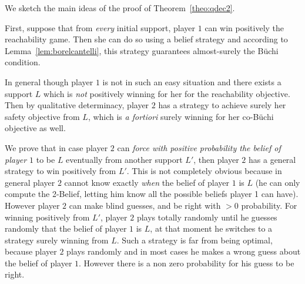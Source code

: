 
\smallskip
We sketch the main ideas of the proof of Theorem~\ref{theo:qdec2}.


First, suppose that from \emph{every} initial support, player $1$ can
win positively the  reachability game.
{Then she can do so using a belief strategy and according to Lemma~\ref{lem:borelcantelli},}
this strategy guarantees
almost-surely the B{\"u}chi condition.

In general though player $1$ is not in such an easy situation and
there exists a support $L$ which is \emph{not} positively winning
for her for the reachability objective.
Then by qualitative determinacy, player $2$ has a strategy to achieve surely her safety objective
from $L$, which is \emph{a fortiori}
surely winning for her co-B{\"u}chi objective as well.


We prove that in case player $2$ can \emph{force with positive
  probability the belief of player $1$} to be $L$ eventually from another
support $L'$, then player $2$
{ has a general strategy to win positively from $L'$}.
This is not completely obvious because in general player $2$ cannot
know exactly \emph{when} the belief of player $1$ is $L$ (he can only
compute the 2-Belief, letting him know all the possible beliefs player
1 can have).  However player $2$ can make blind guesses,
and be right with $>0$ probability.
For winning positively from $L'$, player $2$ plays
totally randomly until he guesses randomly that the belief of player
$1$ is $L$, at that moment he switches to a strategy surely winning
from $L$.  Such a strategy is far from being optimal, because player
$2$ plays randomly and in most cases he makes a wrong guess about the
belief of player $1$.  However 
there is a non zero probability for his guess to be right.

